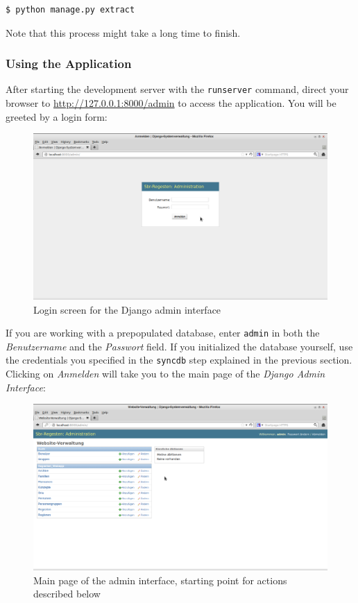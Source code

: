 \begin{verbatim}
$ python manage.py extract
\end{verbatim}

Note that this process might take a long time to finish.

\subsubsection{Using the Application}
\label{sec:use}

After starting the development server with the \texttt{runserver}
command, direct your browser to \url{http://127.0.0.1:8000/admin} to
access the application. You will be greeted by a login form:

\begin{figure}[h]
  \centering
  \includegraphics[scale=0.3]{img/admin-login}
  \caption{Login screen for the Django admin interface}
  \label{fig:admin-login}
\end{figure}

If you are working with a prepopulated database, enter \texttt{admin}
in both the \emph{Benutzername} and the \emph{Passwort} field. If you
initialized the database yourself, use the credentials you specified
in the \texttt{syncdb} step explained in the previous section.
Clicking on \emph{Anmelden} will take you to the main page of the
\emph{Django Admin Interface}:

\begin{figure}[h]
  \centering
  \includegraphics[scale=0.3]{img/admin-main}
  \caption{Main page of the admin interface, starting point for actions described below}
  \label{fig:admin-main}
\end{figure}


